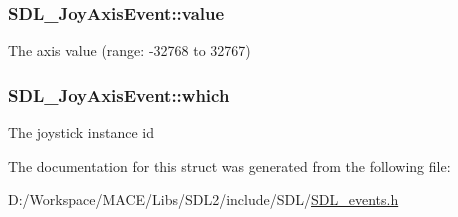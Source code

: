 \subsubsection[{\texorpdfstring{value}{value}}]{ S\+D\+L\+\_\+\+Joy\+Axis\+Event\+::value}\hypertarget{struct_s_d_l___joy_axis_event_a53ee73e7c367934dd6edb69963be5556}{}\label{struct_s_d_l___joy_axis_event_a53ee73e7c367934dd6edb69963be5556}
The axis value (range\+: -\/32768 to 32767) 
\subsubsection[{\texorpdfstring{which}{which}}]{ S\+D\+L\+\_\+\+Joy\+Axis\+Event\+::which}\hypertarget{struct_s_d_l___joy_axis_event_a965719f4703a7091bcc5f07f79fcf7e1}{}\label{struct_s_d_l___joy_axis_event_a965719f4703a7091bcc5f07f79fcf7e1}
The joystick instance id 

The documentation for this struct was generated from the following file\+:\begin{DoxyCompactItemize}
\item 
D\+:/\+Workspace/\+M\+A\+C\+E/\+Libs/\+S\+D\+L2/include/\+S\+D\+L/\hyperlink{_s_d_l__events_8h}{S\+D\+L\+\_\+events.\+h}\end{DoxyCompactItemize}
